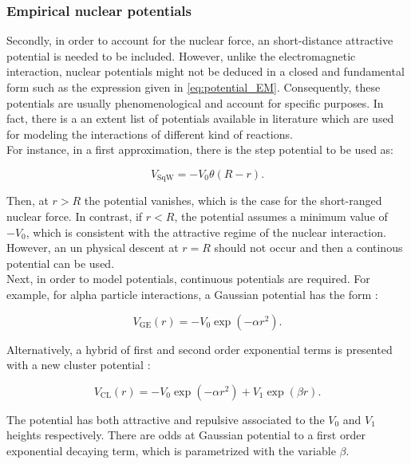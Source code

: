 \documentclass[openany]{book}
\begin{document}
\subsubsection{Empirical nuclear potentials} \label{sub:potential_effective_empirical}
Secondly, in order to account for the nuclear force, an short-distance attractive potential is needed to be included. However, unlike the electromagnetic interaction, nuclear potentials might not be deduced  in a closed and fundamental form such as the expression given in \ref{eq:potential_EM}. Consequently, these  potentials are usually phenomenological and account for specific purposes. In fact, there is a an extent list of potentials available in literature which are used for modeling the interactions of different kind of reactions. \\

For instance, in a first approximation, there is the step potential to be used as: 

\begin{equation} \label{eq:potential_squareWell}
	V_{\mathrm{SqW}} = -V_0\theta(R - r).
\end{equation}

Then, at $r > R$ the potential vanishes, which is the case for the short-ranged nuclear force. In contrast, if $r < R$, the potential assumes a minimum value of $-V_0$, which is consistent with the attractive regime of the nuclear interaction. However, an un physical descent at $r = R$ should not occur and then a continous potential can be used. \\

Next, in order to model potentials, continuous potentials are required. For example, for alpha particle interactions, a Gaussian potential has the form \cite{dubovichenko_2012}:

\begin{equation} \label{eq:potential_gaussianExponential}
	V_{\mathrm{GE}}(r) = - V_0 \exp{(-\alpha r^2 )}.
\end{equation}

 Alternatively, a hybrid of first and second order exponential terms is presented with a new cluster potential \cite{bass_1977, dubovichenko_dzhazairov-kakhramanov_2009}:

\begin{equation} \label{eq:potential_cluster}
	V_{\mathrm{CL}}(r) = - V_0 \exp{(-\alpha r^2 )} + V_1 \exp{(\beta r)}.
\end{equation}

The potential has both attractive and repulsive associated to the $V_0$ and $V_1$ heights respectively. There are odds at Gaussian potential to a first order exponential decaying term, which is parametrized with the variable $\beta$. \\
\end{document}

